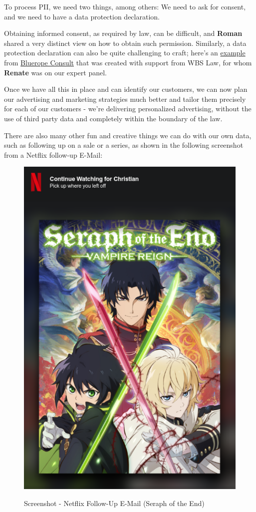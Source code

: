 To process PII, we need two things, among others: We need to ask for consent, and we need to have a data protection declaration.

Obtaining informed consent, as required by law, can be difficult, and \textbf{Roman} shared a very distinct view on how to obtain such permission. Similarly, a data protection declaration can also be quite challenging to craft; here's an \href{https://blueropeconsultonline.de/datenschutz/}{example} from \href{https://blueropeconsultonline.de/}{Bluerope Consult} that was created with support from WBS Law, for whom \textbf{Renate} was on our expert panel.

Once we have all this in place and can identify our customers, we can now plan our advertising and marketing strategies much better and tailor them precisely for each of our customers - we're delivering personalized advertising, without the use of third party data and completely within the boundary of the law.

There are also many other fun and creative things we can do with our own data, such as following up on a sale or a series, as shown in the following screenshot from a Netflix follow-up E-Mail:

\begin{figure}[H]
\centering
\caption {Screenshot - Netflix Follow-Up E-Mail (Seraph of the End)}
\includegraphics[scale=0.6]{images/continue-seraph.png}
\label{fig:seraph}
\end{figure}

